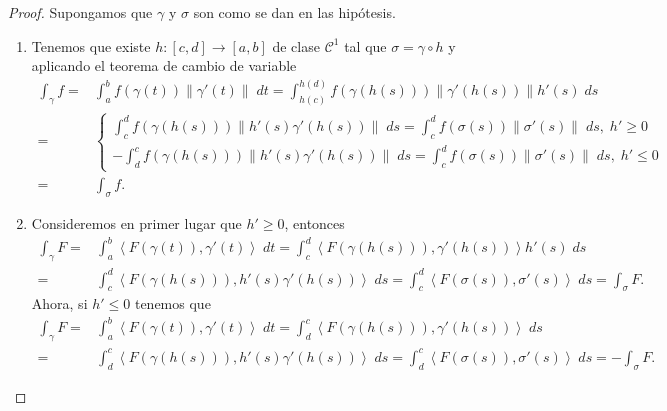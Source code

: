 \begin{proof} Supongamos que $\displaystyle \gamma  $ y $\displaystyle \sigma  $ son como se dan en las hipótesis.
	\begin{enumerate}
	\item Tenemos que existe $\displaystyle h : \left[c,d\right] \to \left[a,b\right]  $ de clase $\displaystyle \mathcal{C}^{1} $ tal que $\displaystyle \sigma = \gamma \circ h $ y aplicando el teorema de cambio de variable
	\[
	\begin{split}
		\int _{\gamma }f = & \int^{b}_{a} f\left(\gamma\left(t\right)\right)\|\gamma'\left(t\right)\| \; dt = \int^{h\left(d\right)}_{h\left(c\right)} f\left(\gamma\left(h\left(s\right)\right)\right)\|\gamma'\left(h\left(s\right)\right)\| h'\left(s\right) \; d s \\
		= &
		\begin{cases}
		\int^{d}_{c} f\left(\gamma\left(h\left(s\right)\right)\right)\|h'\left(s\right)\gamma'\left(h\left(s\right)\right)\| \; d s = \int^{d}_{c} f\left(\sigma\left(s\right)\right)\|\sigma'\left(s\right)\| \; d s  , \; h' \geq 0 \\
		-\int^{c}_{d} f\left(\gamma\left(h\left(s\right)\right)\right)\|h'\left(s\right)\gamma'\left(h\left(s\right)\right)\| \; d s = \int^{d}_{c} f\left(\sigma\left(s\right)\right)\|\sigma'\left(s\right)\| \; d s , \; h' \leq 0
		\end{cases}\\
		= & \int _{\sigma }f 
		.
	\end{split}
	\]
\item Consideremos en primer lugar que $\displaystyle h' \geq 0 $, entonces
		\[
		\begin{split}
			\int _{\gamma }F = & \int^{b}_{a} \left\langle F\left(\gamma\left(t\right)\right), \gamma'\left(t\right) \right\rangle  \; dt = \int^{d}_{c} \left\langle F\left(\gamma\left(h\left(s\right)\right)\right), \gamma'\left(h\left(s\right)\right) \right\rangle h'\left(s\right) \; d s \\
			= & \int^{d}_{c} \left\langle F\left(\gamma\left(h\left(s\right)\right)\right), h'\left(s\right)\gamma'\left(h\left(s\right)\right) \right\rangle  \; d s =\int^{d}_{c} \left\langle F\left(\sigma \left(s\right)\right), \sigma'\left(s\right) \right\rangle  \; d s = \int _{\sigma }F .
		\end{split}
		\]
		Ahora, si $\displaystyle h' \leq 0 $ tenemos que
		\[
		\begin{split}
			\int _{\gamma }F = & \int^{b}_{a} \left\langle F\left(\gamma\left(t\right)\right), \gamma'\left(t\right) \right\rangle  \; dt = \int^{c}_{d} \left\langle F\left(\gamma\left(h\left(s\right)\right)\right), \gamma'\left(h\left(s\right)\right) \right\rangle  \; d s \\
			= & \int^{c}_{d} \left\langle F\left(\gamma\left(h\left(s\right)\right)\right), h'\left(s\right)\gamma'\left(h\left(s\right)\right) \right\rangle  \; d s = \int^{c}_{d} \left\langle F\left(\sigma\left(s\right)\right), \sigma'\left(s\right) \right\rangle  \; d s = -\int _{\sigma }F .
		\end{split}
		\]
	\end{enumerate}
	\end{proof}
